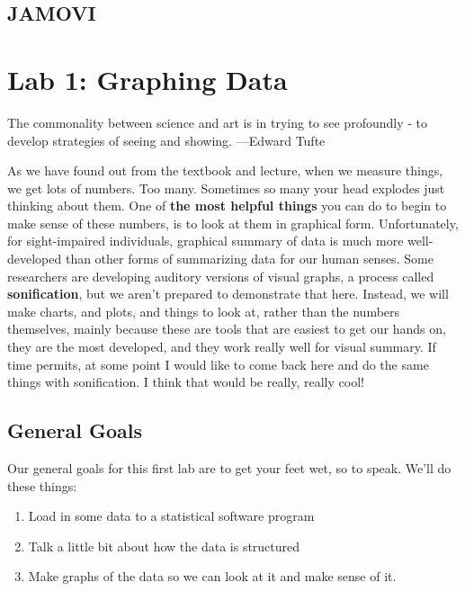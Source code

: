 \documentclass[]{book}
\providecommand{\tightlist}{%
  \setlength{\itemsep}{0pt}\setlength{\parskip}{0pt}}
\begin{document}
\section{JAMOVI}\label{jamovi}

\chapter{Lab 1: Graphing Data}\label{lab-1-graphing-data}

{ The commonality between science and art is in trying to see profoundly
- to develop strategies of seeing and showing. ---Edward Tufte }

As we have found out from the textbook and lecture, when we measure
things, we get lots of numbers. Too many. Sometimes so many your head
explodes just thinking about them. One of \textbf{the most helpful
things} you can do to begin to make sense of these numbers, is to look
at them in graphical form. Unfortunately, for sight-impaired
individuals, graphical summary of data is much more well-developed than
other forms of summarizing data for our human senses. Some researchers
are developing auditory versions of visual graphs, a process called
\textbf{sonification}, but we aren't prepared to demonstrate that here.
Instead, we will make charts, and plots, and things to look at, rather
than the numbers themselves, mainly because these are tools that are
easiest to get our hands on, they are the most developed, and they work
really well for visual summary. If time permits, at some point I would
like to come back here and do the same things with sonification. I think
that would be really, really cool!

\section{General Goals}\label{general-goals}

Our general goals for this first lab are to get your feet wet, so to
speak. We'll do these things:

\begin{enumerate}
\def\labelenumi{\arabic{enumi}.}
\tightlist
\item
  Load in some data to a statistical software program
\item
  Talk a little bit about how the data is structured
\item
  Make graphs of the data so we can look at it and make sense of it.
\end{enumerate}
\end{document}
